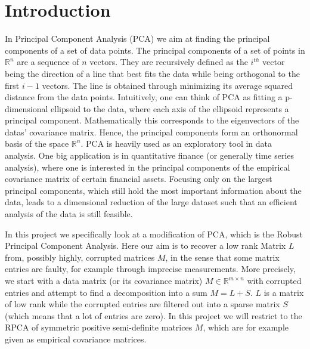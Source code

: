 \section{Introduction}

In Principal Component Analysis (PCA) we aim at finding the principal components of a set of data points. The principal components of a set of points in $\mathbb{R}^n$ are a sequence of $n$ vectors. They are recursively defined as the $i^{th}$ vector being the direction of a line that best fits the data while being orthogonal to the first $i-1$ vectors. The line is obtained through minimizing its average squared distance from the data points. Intuitively, one can think of PCA as fitting a p-dimensional ellipsoid to the data, where each axis of the ellipsoid represents a principal component. Mathematically this corresponds to the eigenvectors of the datas' covariance matrix. Hence, the principal components form an orthonormal basis of the space $\mathbb{R}^n$. PCA is heavily used as an exploratory tool in data analysis. One big application is in quantitative finance (or generally time series analysis), where one is interested in the principal components of the empirical covariance matrix of certain financial assets. Focusing only on the largest principal components, which still hold the most important information about the data, leads to a dimensional reduction of the large dataset such that an efficient analysis of the data is still feasible.

In this project we specifically look at a modification of PCA, which is the Robust Principal Component Analysis. Here our aim is to recover a low rank Matrix $L$ from, possibly highly, corrupted matrices $M$, in the sense that some matrix entries are faulty, for example through imprecise measurements. More precisely, we start with a data matrix (or its covariance matrix) $M \in \mathbb{R}^{m \times n}$ with corrupted entries and attempt to find a decomposition into a sum $M = L + S$. $L$ is a matrix of low rank while the corrupted entries are filtered out into a sparse matrix $S$ (which means that a lot of entries are zero). In this project we will restrict to the RPCA of symmetric positive semi-definite matrices $M$, which are for example given as empirical covariance matrices.

